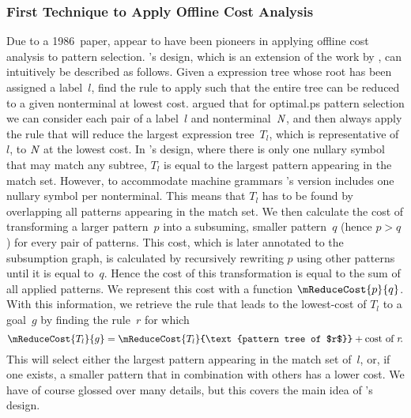 \subsubsection{First Technique to Apply Offline Cost Analysis}

Due to a 1986~paper, \textcite{HatcherChristopher:1986} appear to have been
pioneers in applying \gls{offline cost analysis} to \gls{pattern selection}.
%
\citeauthor{HatcherChristopher:1986}'s design, which is an extension of the work
by \citeauthor{HoffmannODonnell:1982}, can intuitively be described as follows.
%
Given a \gls{expression tree} whose \gls{root} has been assigned a
label~$l$\hspace{-.8pt}, find the \gls{rule} to apply such that the entire
\gls{tree} can be reduced to a given \gls{nonterminal} at lowest cost.
%
\citeauthor{HatcherChristopher:1986} argued that for \gls{optimal.ps}
\gls{pattern selection} we can consider each pair of a label~$l$ and
\gls{nonterminal}~$\mNT{N}$, and then always apply the \gls{rule} that will
reduce the largest \gls{expression tree}~$T_l$, which is representative
of~$l$\hspace{-.8pt}, to $\mNT{N}$ at the lowest cost.
%
In \citeauthor{HoffmannODonnell:1982}'s design, where there is only one
\gls{nullary symbol} that may match any \gls{subtree}, $T_l$ is equal to the
largest \gls{pattern} appearing in the \gls{match set}.
%
However, to accommodate \glspl{machine grammar}
\citeauthor{HatcherChristopher:1986}'s version includes one \gls{nullary symbol}
per \gls{nonterminal}.
%
This means that $T_l$ has to be found by overlapping all \glspl{pattern}
appearing in the \gls{match set}.
%
We then calculate the cost of transforming a larger \gls{pattern}~$p$ into a
subsuming, smaller \gls{pattern}~$q$ (hence \mbox{$p > q$}) for every pair of
\glspl{pattern}.
%
This cost, which is later annotated to the \gls{subsumption graph}, is
calculated by recursively rewriting $p$ using other \glspl{pattern} until it is
equal to~$q$\hspace{-.8pt}.
%
Hence the cost of this transformation is equal to the sum of all applied
\glspl{pattern}.
%
We represent this cost with a function $\mReduceCost{p}{q}$.
%
With this information, we retrieve the \gls{rule} that leads to the lowest-cost
 of $T_l$ to a goal~$g$ by finding the \gls{rule}~$r$
for which
%
\begin{displaymath}
  \mReduceCost{T_l}{g} =
  \mReduceCost{T_l}{\text{pattern tree of $r$}} + \text{cost of $r$}\!.
\end{displaymath}
%
This will select either the largest \gls{pattern} appearing in the \gls{match
  set} of~$l$\hspace{-.8pt}, or, if one exists, a smaller \gls{pattern} that in
combination with others has a lower cost.
%
We have of course glossed over many details, but this covers the main idea of
\citeauthor{HatcherChristopher:1986}'s design.

